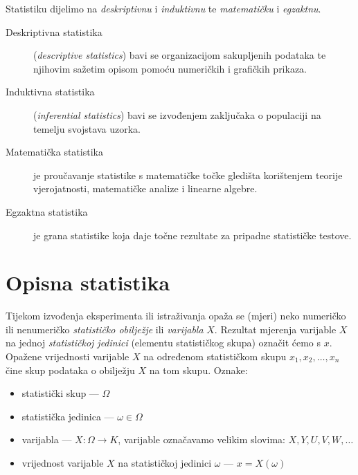 \documentclass[12pt]{scrartcl}
\begin{document}
Statistiku dijelimo na \emph{deskriptivnu} i \emph{induktivnu} te \emph{matematičku} i \emph{egzaktnu}.
\begin{description}
\item [Deskriptivna statistika] (\textsl{descriptive statistics}) bavi se organizacijom sakupljenih podataka te njihovim sažetim opisom pomoću numeričkih i grafičkih prikaza.
\item [Induktivna statistika] (\textsl{inferential statistics}) bavi se izvođenjem zaključaka o populaciji na temelju svojstava uzorka.
\item [Matematička statistika] je proučavanje statistike s matematičke točke gledišta ko\-ri\-šte\-njem teorije vjerojatnosti, matematičke analize i linearne algebre.
\item [Egzaktna statistika] je grana statistike koja daje točne rezultate za pripadne statističke
testove.
\end{description}
%
\section{Opisna statistika}
Tijekom izvođenja eksperimenta ili istraživanja opaža se (mjeri) neko numeričko ili nenumeričko \emph{statističko obilježje} ili \emph{varijabla} $X$. Rezultat mjerenja varijable $X$ na jednoj \emph{statističkoj jedinici} (elementu statističkog skupa) označit ćemo s $x$. Opažene vrijednosti varijable $X$ na određenom statističkom skupu $x_1,x_2,\dotsc,x_n$ čine skup podataka o obilježju $X$ na tom skupu. Oznake:
\begin{itemize}
    \item statistički skup --- $\Omega$
    \item statistička jedinica --- $\omega\in\Omega$
    \item varijabla --- $X:\Omega\rightarrow K$,
    varijable označavamo velikim slovima: $X,Y,U,V,W,\dotsc$
    \item vrijednost varijable $X$ na statističkoj jedinici $\omega$ --- $x=X(\omega)$
\end{itemize}
%
\end{document}
